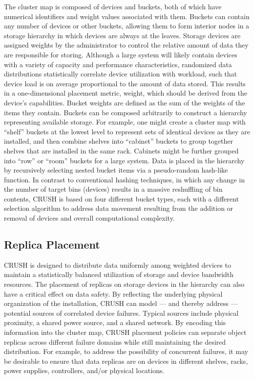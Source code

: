 \documentclass[12pt,a4paper]{report}
\begin{document}
The cluster map is composed of devices and buckets, both of which have
numerical identifiers and weight values associated with them. Buckets can
contain any number of devices or other buckets, allowing them to form interior
nodes in a storage hierarchy in which devices are always at the leaves. Storage
devices are assigned weights by the administrator to control the relative
amount of data they are responsible for storing.  Although a large system will
likely contain devices with a variety of capacity and performance
characteristics, randomized  data  distributions  statistically  correlate
device utilization with workload, such that device load is on average
proportional to the amount of data stored. This results in a one-dimensional
placement metric, weight, which should be derived from the device's
capabilities. Bucket weights are defined as the sum of the weights of the items
they contain. Buckets can be composed arbitrarily to construct a hierarchy
representing available storage. For example, one might create a cluster map
with ``shelf'' buckets at the lowest level to  represent sets  of  identical
devices as  they  are  installed, and  then  combine shelves into ``cabinet''
buckets to  group together shelves that are installed in the same rack.
Cabinets might be further grouped into ``row'' or ``room'' buckets for a large
system.  Data is placed in the hierarchy by recursively selecting nested bucket
items via a pseudo-random hash-like function. In contrast to conventional
hashing techniques, in which any change in the number of target bins (devices)
results  in  a  massive  reshuffling  of  bin  contents,  CRUSH  is based on
four different bucket types,  each with a different selection algorithm to
address data movement resulting from the addition or removal of devices and
overall computational complexity.

\subsection{Replica Placement}

CRUSH  is  designed  to  distribute  data  uniformly  among weighted devices to
maintain a statistically balanced utilization of storage and device bandwidth
resources. The placement of replicas on storage devices in the hierarchy can
also have a  critical effect on data safety. By reflecting the underlying
physical organization of the installation, CRUSH can model --- and thereby
address --- potential sources of correlated  device  failures. Typical sources
include physical proximity, a shared power source, and a shared network. By
encoding this information into the cluster map, CRUSH placement policies can
separate object replicas across different failure domains while still
maintaining the desired distribution. For example, to address the possibility
of concurrent failures, it may be desirable to ensure that data replicas are on
devices in different shelves, racks, power supplies, controllers, and/or
physical locations.
\end{document}
